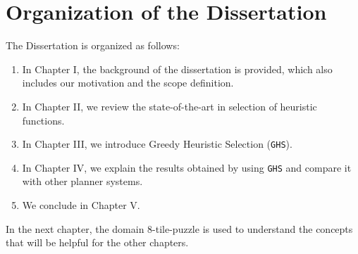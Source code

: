 \section{Organization of the Dissertation}
\noindent
The Dissertation is organized as follows: 
\begin{enumerate}
\item In Chapter I, the background of the dissertation is provided, which also includes our motivation and the scope definition.
\item In Chapter II, we review the state-of-the-art in selection of heuristic functions.
\item In Chapter III, we introduce Greedy Heuristic Selection (\texttt{GHS}). 
\item In Chapter IV, we explain the results obtained by using \texttt{GHS} and compare it with other planner systems.
\item We conclude in Chapter V.
\end{enumerate}

In the next chapter, the domain 8-tile-puzzle is used to understand the concepts that will be helpful for the other chapters.

\clearpage